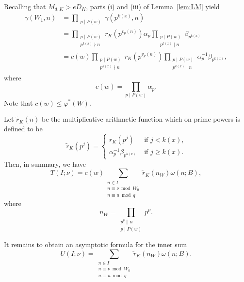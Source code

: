 \documentclass[11pt,letterpaper]{amsart}
\renewcommand{\leq}{\leqslant}
\renewcommand{\geq}{\geqslant}
\theoremstyle{definition}
\numberwithin{equation}{section}
\newcommand{\0}{\mathbf{0}}
\begin{document}
Recalling that $M_{d,K}>eD_K$, 
parts (i) and (iii) of Lemma~\ref{lem:LM} yield
\begin{equation}\label{eq:calc}
\begin{split}
\gamma(W_1,n)
&=\prod_{\substack{p\mid P(w)}} \gamma(p^{k(x)},n) \\
&=\prod_{\substack{p\mid P(w)\\
p^{k(x)}\nmid n}}
r_K(p^{v_p(n)}) \alpha_p
\prod_{\substack{p\mid P(w)\\
p^{k(x)}\mid n
}}
\beta_{p^{k(x)}}\\
&=c(w)
\prod_{\substack{p\mid P(w)\\
p^{k(x)}\nmid n}}
r_K(p^{v_p(n)}) 
\prod_{\substack{p\mid P(w)\\
p^{k(x)}\mid n
}}
\alpha_p^{-1}\beta_{p^{k(x)}},
\end{split}
\end{equation}
where 
\begin{equation}\label{eq:c(w)}
c(w)=\prod_{p\mid P(w)} \alpha_p.
\end{equation}
Note that $c(w)\leq \varphi^*(W)$. 

Let $\tilde r_K (n)$ be the multiplicative arithmetic function which on prime powers is defined to be
\begin{equation}\label{eq:r-tilde}
\tilde r_K (p^j) =\begin{cases}
r_K(p^j) &\text{ if $j<k(x)$,}\\
\alpha_p^{-1}\beta_{p^{k(x)}} &\text{ if $j\geq k(x)$.}
\end{cases}
\end{equation}
Then, in summary, we have
\begin{equation}\label{eq:berkley-hotel}
T(I;\nu)=
c(w)
\sum_{\substack{n\in I 
\\ n\equiv \nu\bmod{W_0}\\
n\equiv u\bmod q}} \tilde r_K(n_W) \omega(n;B),
\end{equation}
where
$$
n_W=\prod_{\substack{p^\nu\| n\\ p\mid P(w)}}p^\nu.
$$


It remains to obtain an asymptotic formula for the inner sum 
\begin{equation}\label{eq:Unu}
U(I;\nu)=
\sum_{\substack{n\in I
\\ n\equiv \nu\bmod{W_0}\\
n\equiv u\bmod q}} \tilde r_K(n_W) \omega(n;B).
\end{equation}
\end{document}
